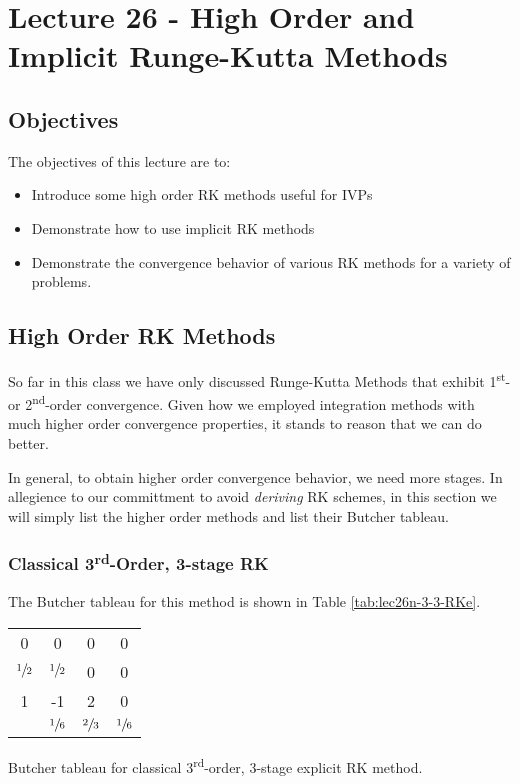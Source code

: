 \chapter{Lecture 26 - High Order and Implicit Runge-Kutta Methods}
\label{ch:lec26n}
\section{Objectives}
The objectives of this lecture are to:
\begin{itemize}
\item Introduce some high order RK methods useful for IVPs
\item Demonstrate how to use implicit RK methods
\item Demonstrate the convergence behavior of various RK methods for a variety of problems.
\end{itemize}
\setcounter{lstannotation}{0}

\section{High Order RK Methods}
So far in this class we have only discussed Runge-Kutta Methods that exhibit 1\textsuperscript{st}- or 2\textsuperscript{nd}-order convergence.  Given how we employed integration methods with much higher order convergence properties, it stands to reason that we can do better.

In general, to obtain higher order convergence behavior, we need more stages.  In allegience to our committment to avoid \emph{deriving} RK schemes, in this section we will simply list the higher order methods and list their Butcher tableau.

\subsection{Classical 3\textsuperscript{rd}-Order, 3-stage RK}
The Butcher tableau for this method is shown in Table \ref{tab:lec26n-3-3-RKe}.
\begin{margintable}
\begin{tabular}{c|ccc}
0 & 0 & 0 & 0 \\
$\sfrac{1}{2}$ & $\sfrac{1}{2}$ & 0 & 0 \\
1 & -1 & 2 & 0 \\ \hline
  & $\sfrac{1}{6}$ & $\sfrac{2}{3}$ & $\sfrac{1}{6}$ \\
\end{tabular}
\caption{Butcher tableau for classical 3\textsuperscript{rd}-order, 3-stage explicit RK method.}
\label{tab:lec26n-3-3-RKe}
\end{margintable}

